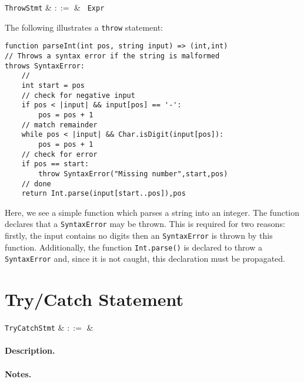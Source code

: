 \begin{syntax}
  \verb+ThrowStmt+ & $::=$ & \ \verb+Expr+\\
\end{syntax}

\noindent The following illustrates a \lstinline{throw} statement:

\begin{lstlisting}
function parseInt(int pos, string input) => (int,int)
// Throws a syntax error if the string is malformed
throws SyntaxError:
    //
    int start = pos
    // check for negative input
    if pos < |input| && input[pos] == '-':
        pos = pos + 1
    // match remainder
    while pos < |input| && Char.isDigit(input[pos]):
        pos = pos + 1
    // check for error
    if pos == start:
        throw SyntaxError("Missing number",start,pos)
    // done
    return Int.parse(input[start..pos]),pos
\end{lstlisting}
Here, we see a simple function which parses a string into an integer.  The function declares that a \lstinline{SyntaxError} may be thrown.  This is required for two reasons:  firstly, the input contains no digits then an \lstinline{SyntaxError} is thrown by this function.  Additionally, the function \lstinline{Int.parse()} is declared to throw a \lstinline{SyntaxError} and, since it is not caught, this declaration must be propagated.


\section{Try/Catch Statement}
\label{c_stmts_try_catch}
\begin{syntax}
  \verb+TryCatchStmt+ & $::=$ &\\
\end{syntax}

\paragraph{Description.}

\noindent

\paragraph{Notes.} 


